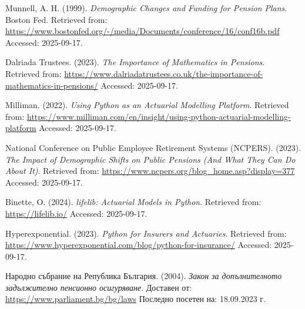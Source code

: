 \documentclass[a4paper,12pt]{article}
\begin{document}
\newpage
\begin{thebibliography}{99} %

        Munnell, A. H. (1999).
        \newblock \emph{Demographic Changes and Funding for Pension Plans}.
        \newblock Boston Fed. Retrieved from: \url{https://www.bostonfed.org/-/media/Documents/conference/16/conf16b.pdf}
        \newblock Accessed: 2025-09-17.

        Dalriada Trustees. (2023).
        \newblock \emph{The Importance of Mathematics in Pensions}.
        \newblock Retrieved from: \url{https://www.dalriadatrustees.co.uk/the-importance-of-mathematics-in-pensions/}
        \newblock Accessed: 2025-09-17.

        Milliman. (2022).
        \newblock \emph{Using Python as an Actuarial Modelling Platform}.
        \newblock Retrieved from: \url{https://www.milliman.com/en/insight/using-python-actuarial-modelling-platform}
        \newblock Accessed: 2025-09-17.

        National Conference on Public Employee Retirement Systems (NCPERS). (2023).
        \newblock \emph{The Impact of Demographic Shifts on Public Pensions (And What They Can Do About It)}.
        \newblock Retrieved from: \url{https://www.ncpers.org/blog_home.asp?display=377}
        \newblock Accessed: 2025-09-17.

        Binette, O. (2024).
        \newblock \emph{lifelib: Actuarial Models in Python}.
        \newblock Retrieved from: \url{https://lifelib.io/}
        \newblock Accessed: 2025-09-17.

        Hyperexponential. (2023).
        \newblock \emph{Python for Insurers and Actuaries}.
        \newblock Retrieved from: \url{https://www.hyperexponential.com/blog/python-for-insurance/}
        \newblock Accessed: 2025-09-17.

        Народно събрание на Република България. (2004).
        \newblock \emph{Закон за допълнителното задължително пенсионно осигуряване}.
        \newblock Доставен от: \url{https://www.parliament.bg/bg/laws}
        \newblock Последно посетен на: 18.09.2023 г.


\end{thebibliography}
\end{document}
